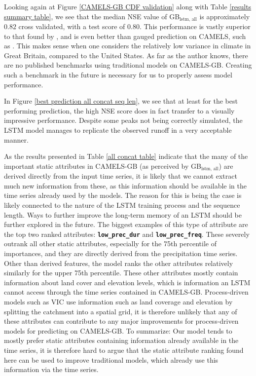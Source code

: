 Looking again at Figure \ref{CAMELS-GB CDF validation} along with Table 
\ref{results summary table}, we see that the median NSE value of GB$_\text{lstm, all}$ 
is approximately $0.82$ cross validated, with a test score of $0.80$. 
This performance is vastly superior to that found by \citet{lstm_third_paper}, and 
is even better than gauged prediction on CAMELS, such as \citet{lstm_second_paper}. 
This makes sense when one considers the relatively low variance in climate in Great 
Britain, compared to the United States. 
As far as the author knows, there are no published benchmarks using traditional models on 
CAMELS-GB. Creating such a benchmark in the future is necessary for us to properly 
assess model performance.

In Figure \ref{best prediction all concat seq len}, we see that at least for the 
best performing prediction, the high NSE score does 
in fact transfer to a visually impressive performance. Despite some peaks not being 
correctly simulated, the LSTM model manages to replicate the observed runoff in a 
very acceptable manner.

As the results presented in Table \ref{all concat table}
indicate that the many of the important static attributes in CAMELS-GB (as perceived by 
GB$_\text{lstm, all}$) are derived directly from the 
input time series, it is likely that we cannot extract much new information from 
these, as this information should be available in the time series already used by 
the models. The reason for this is being the case is likely connected to the 
nature of the LSTM training process and the sequence length. Ways 
to further improve the long-term memory of an LSTM should be further explored 
in the future. The biggest examples of this type of attribute are the top two ranked 
attributes: \textbf{\texttt{low\_prec\_dur}} and \textbf{\texttt{low\_prec\_freq}}. 
These severely outrank all other static attributes, especially for the 75th percentile 
of importances, and they are directly derived from the precipitation time series.
Other than derived features, the model ranks the other attributes relatively similarly 
for the upper 75th percentile. These other attributes mostly contain information 
about land cover and elevation levels, which is information an LSTM cannot access 
through the time series contained in CAMELS-GB. Process-driven models such as VIC 
use information such as land coverage and elevation by splitting the catchment 
into a spatial grid, it is therefore unlikely that any of these attributes can 
contribute to any major improvements for process-driven models for predicting 
on CAMELS-GB. To summarize: Our model tends to mostly prefer static attributes 
containing information already available in the time series, it is therefore hard 
to argue that the static attribute ranking found here can be used to improve 
traditional models, which already use this information via the time series.

